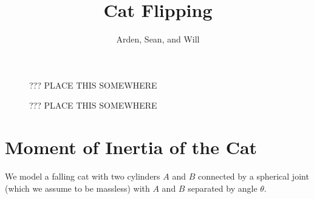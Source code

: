 \documentclass[12]{amsart}
\theoremstyle{definition}
\begin{document}
\title{Cat Flipping}
\author{Arden, Sean, and Will}
\maketitle

\begin{figure}[htpb]
  \centering
  
  \caption{??? PLACE THIS SOMEWHERE}%
  \label{fig:cat_axis}
\end{figure}

\begin{figure}[htpb]
  \centering
  
  \caption{??? PLACE THIS SOMEWHERE}%
  \label{fig:cat_model}
\end{figure}

\section{Moment of Inertia of the Cat}
We model a falling cat with two cylinders $A$ and $B$ connected by a spherical joint (which we assume to be massless) with $A$ and $B$ separated by angle $\theta$.
\end{document}
